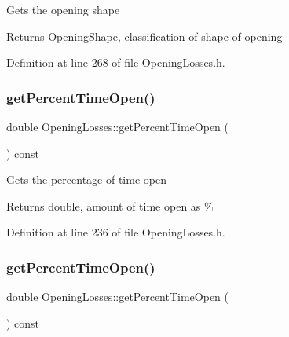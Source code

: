 Gets the opening shape \begin{DoxyReturn}{Returns}
Opening\+Shape, classification of shape of opening 
\end{DoxyReturn}


Definition at line 268 of file Opening\+Losses.\+h.

\mbox{\label{class_opening_losses_aeefc3790a569008ff2e804033a9efea3}} 
\subsubsection{\texorpdfstring{get\+Percent\+Time\+Open()}{getPercentTimeOpen()}\hspace{0.1cm}{\footnotesize\ttfamily [1/3]}}
{\footnotesize\ttfamily double Opening\+Losses\+::get\+Percent\+Time\+Open (\begin{DoxyParamCaption}{ }\end{DoxyParamCaption}) const\hspace{0.3cm}{\ttfamily [inline]}}

Gets the percentage of time open \begin{DoxyReturn}{Returns}
double, amount of time open as \% 
\end{DoxyReturn}


Definition at line 236 of file Opening\+Losses.\+h.

\mbox{\label{class_opening_losses_aeefc3790a569008ff2e804033a9efea3}} 
\subsubsection{\texorpdfstring{get\+Percent\+Time\+Open()}{getPercentTimeOpen()}\hspace{0.1cm}{\footnotesize\ttfamily [2/3]}}
{\footnotesize\ttfamily double Opening\+Losses\+::get\+Percent\+Time\+Open (\begin{DoxyParamCaption}{ }\end{DoxyParamCaption}) const\hspace{0.3cm}{\ttfamily [inline]}}

